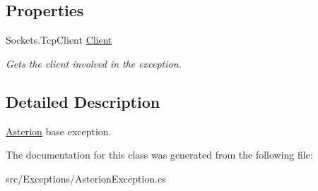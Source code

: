 \subsection*{Properties}
\begin{DoxyCompactItemize}
\item 
\hypertarget{classAsterion_1_1Exceptions_1_1AsterionException_adc82008f4f35081f0bcd86f0f8a7f578}{Sockets.\-Tcp\-Client \hyperlink{classAsterion_1_1Exceptions_1_1AsterionException_adc82008f4f35081f0bcd86f0f8a7f578}{Client}}\label{classAsterion_1_1Exceptions_1_1AsterionException_adc82008f4f35081f0bcd86f0f8a7f578}

\begin{DoxyCompactList}\small\item\em Gets the client involved in the exception. \end{DoxyCompactList}\end{DoxyCompactItemize}


\subsection{Detailed Description}
\hyperlink{namespaceAsterion}{Asterion} base exception. 

The documentation for this class was generated from the following file\-:\begin{DoxyCompactItemize}
\item 
src/\-Exceptions/Asterion\-Exception.\-cs\end{DoxyCompactItemize}
